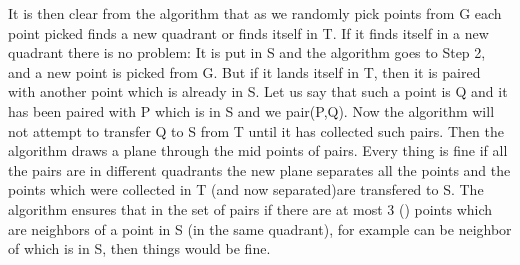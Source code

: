 \documentclass[english]{article}
\begin{document}
It is then clear from the algorithm that as we randomly pick points
from G each point picked finds a new quadrant or finds itself in T.
If it finds itself in a new quadrant there is no problem: It is put
in S and the algorithm goes to Step 2, and a new point is picked from
G. But if it lands itself in T, then it is paired with another point
which is already in S. Let us say that such a point is Q and it has
been paired with P which is in S and we pair(P,Q). Now the algorithm
will not attempt to transfer Q to S from T until it has collected
 such pairs. Then the algorithm draws a plane through the mid
points of  pairs. Every thing is fine if all the pairs are in
different quadrants the new plane separates all the  points and
the  points which were collected in T (and now separated)are transfered
to S. The algorithm ensures that in the set of  pairs if there
are at most 3 () points which are neighbors of a point in S (in the same quadrant), for example  can be neighbor of  which is in S, then things would be fine.
\end{document}

